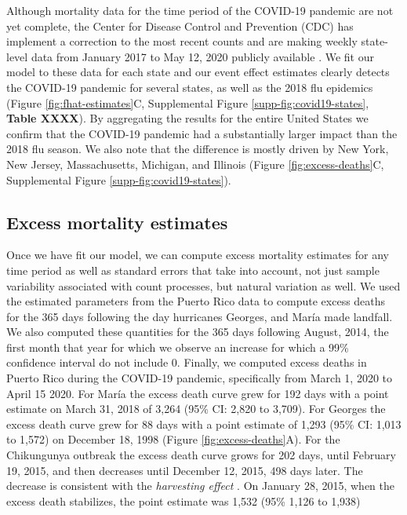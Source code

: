 \documentclass[11pt]{article}
\begin{document}
Although mortality data for the time period of the COVID-19 pandemic are not yet complete, the Center for Disease Control and Prevention (CDC) has implement a correction to the most recent counts and are making weekly state-level data from January 2017 to May 12, 2020 publicly available \cite{cdc2020covid19}. We fit our model to these data for each state and our event effect estimates clearly detects the COVID-19 pandemic for several states, as well as the 2018 flu epidemics (Figure \ref{fig:fhat-estimates}C, Supplemental Figure \ref{supp-fig:covid19-states}, \textbf{Table XXXX}). By aggregating the results for the entire United States we confirm that the COVID-19 pandemic had a substantially larger impact than the 2018 flu season. We also note that the difference is mostly driven by New York, New Jersey, Massachusetts, Michigan, and Illinois (Figure \ref{fig:excess-deaths}C, Supplemental Figure \ref{supp-fig:covid19-states}).

\subsection{Excess mortality estimates}
\label{subsec:excess-mortality}
Once we have fit our model, we can compute excess mortality estimates for any time period as well as standard errors that take into account, not just sample variability associated with count processes, but natural variation as well. We used the estimated parameters from the Puerto Rico data to compute excess deaths for the 365 days following the day hurricanes Georges, and Mar\'ia made landfall. We also computed these quantities for the 365 days following August, 2014, the first month that year for which we observe an increase for which a 99\% confidence interval do not include 0. Finally, we computed excess deaths in Puerto Rico during the COVID-19 pandemic, specifically from March 1, 2020 to April 15 2020. For Mar\'ia the excess death curve grew for 192 days with a point estimate on March 31, 2018 of 3,264 (95\% CI: 2,820 to 3,709). For Georges the excess death curve grew for 88 days with a point estimate of 1,293 (95\% CI: 1,013 to 1,572) on December 18, 1998 (Figure \ref{fig:excess-deaths}A). For the Chikungunya outbreak the excess death curve grows for 202 days, until February 19, 2015, and then decreases until December 12, 2015, 498 days later. The decrease is consistent with the \emph{harvesting effect} \cite{hajat2005mortality, dushoff2006mortality}. On January 28, 2015, when the excess death stabilizes, the point estimate was 1,532 (95\% 1,126 to 1,938)
\end{document}
